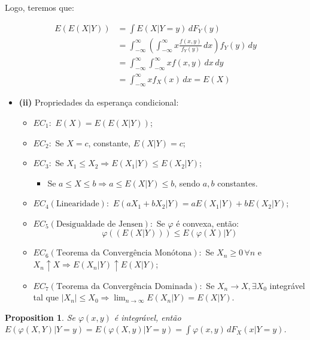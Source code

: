 \documentclass[
]{article}
\providecommand{\tightlist}{%
  \setlength{\itemsep}{0pt}\setlength{\parskip}{0pt}}
\newtheorem{proposition}{Proposition}[section]
\theoremstyle{definition}
\theoremstyle{definition}
\theoremstyle{definition}
\theoremstyle{definition}
\theoremstyle{remark}
\begin{document}
Logo, teremos que:

\begin{align*}
E(E(X|Y)) &= \int E(X|Y = y) \, dF_{Y}(y) \\
&= \int_{-\infty}^{\infty}\left(\int_{-\infty}^{\infty}x\frac{f(x,y)}{f_{Y}(y)}\, dx\right)f_{Y}(y) \, dy \\
&= \int_{-\infty}^{\infty}\int_{-\infty}^{\infty}xf(x,y)\, dx \, dy \\
&= \int_{-\infty}^{\infty}xf_{X}(x) \, dx = E(X)
\end{align*}

\begin{itemize}
\tightlist
\item
  \textbf{(ii)} Propriedades da esperança condicional:

  \begin{itemize}
  \tightlist
  \item
    \(EC_{1}:\) \(E(X) = E(E(X|Y))\);
  \item
    \(EC_{2}:\) Se \(X = c\), constante, \(E(X|Y) = c\);
  \item
    \(EC_{3}:\) Se \(X_{1} \le X_{2} \Rightarrow E(X_{1}|Y) \le E(X_{2}|Y)\);

    \begin{itemize}
    \tightlist
    \item
      Se \(a \le X \le b \Rightarrow a \le E(X|Y) \le b\), sendo \(a,b\) constantes.
    \end{itemize}
  \item
    \(EC_{4}(\text{Linearidade}):\) \(E(aX_{1} + bX_{2}|Y) = aE(X_{1}|Y) + bE(X_{2}|Y)\);
  \item
    \(EC_{5}(\text{Desigualdade de Jensen}):\) Se \(\varphi\) é convexa, então:
    \begin{equation*}
    \varphi((E(X|Y))) \le E(\varphi(X)|Y)
    \end{equation*}
  \item
    \(EC_{6}(\text{Teorema da Convergência Monótona}):\) Se \(X_{n} \ge 0 \,\forall n\) e \(X_{n} \uparrow X \Rightarrow E(X_{n}|Y) \uparrow E(X|Y)\);
  \item
    \(EC_{7}(\text{Teorema da Convergência Dominada}):\) Se \(X_{n} \to X, \exists X_{0}\) integrável tal que \(|X_{n}| \le X_{0} \Rightarrow \lim_{n \to \infty}E(X_{n}|Y) = E(X|Y)\).
  \end{itemize}
\end{itemize}

\begin{proposition}
Se \(\varphi(x,y)\) é integrável, então \(E(\varphi(X,Y)|Y = y) = E(\varphi(X,y)|Y = y) = \int \varphi(x,y) \, dF_{X}(x|Y = y)\).
\end{proposition}
\end{document}
